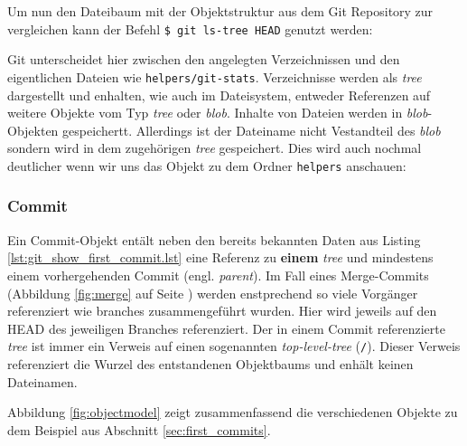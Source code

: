 

Um nun den Dateibaum mit der Objektstruktur aus dem Git Repository zur vergleichen kann der Befehl \texttt{\$ git ls-tree HEAD} genutzt werden:



Git unterscheidet hier zwischen den angelegten Verzeichnissen und den
eigentlichen Dateien wie \texttt{helpers/git-stats}. Verzeichnisse werden als
\textit{tree} dargestellt und enhalten, wie auch im Dateisystem, entweder
Referenzen auf weitere Objekte vom Typ \textit{tree} oder \textit{blob}.
Inhalte von Dateien werden in \textit{blob}-Objekten gespeichertt. Allerdings
ist der Dateiname nicht Vestandteil des \textit{blob} sondern wird in dem
zugehörigen \textit{tree} gespeichert. Dies wird auch nochmal deutlicher wenn
wir uns das Objekt zu dem Ordner \texttt{helpers} anschauen:



\subsubsection{Commit}\label{sec:commitobject}
Ein Commit-Objekt entält neben den bereits bekannten Daten aus Listing
\ref{lst:git_show_first_commit.lst} eine Referenz zu \textbf{einem}
\textit{tree} und mindestens einem vorhergehenden Commit (engl.
\textit{parent}). Im Fall eines Merge-Commits (Abbildung \ref{fig:merge} auf
Seite \pageref{fig:merge}) werden enstprechend so viele Vorgänger referenziert
wie branches zusammengeführt wurden. Hier wird jeweils auf den \gls{HEAD} des
jeweiligen Branches referenziert. Der in einem Commit referenzierte
\textit{tree} ist immer ein Verweis auf einen sogenannten
\textit{top-level-tree} (\texttt{/}). Dieser Verweis referenziert die Wurzel des
entstandenen Objektbaums und enhält keinen Dateinamen.

Abbildung \ref{fig:objectmodel} zeigt zusammenfassend die verschiedenen Objekte
zu dem Beispiel aus Abschnitt \ref{sec:first_commits}.

